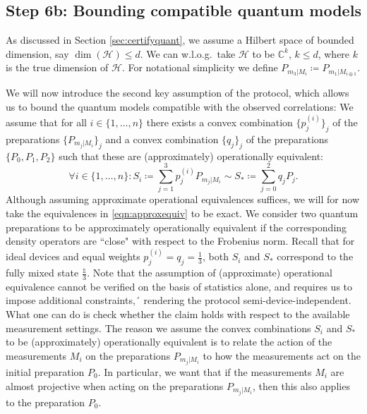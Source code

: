 \subsection{Step 6b: Bounding compatible quantum models}
\label{sec:boundingmodels}
As discussed in Section \ref{sec:certifyquant}, we assume a Hilbert space of bounded dimension, say $\operatorname{dim}(\mathcal{H})\leq d$. We can w.l.o.g.\ take $\mathcal{H}$ to be $\mathbb{C}^k$, $k\leq d$, where $k$ is the true dimension of $\mathcal{H}$. For notational simplicity we define $P_{m_3\vert M_i}\coloneqq P_{m_1\vert M_{i\oplus 1}}$.

We will now introduce the second key assumption of the protocol, which allows us to bound the quantum models compatible with the observed correlations: We assume that for all $i\in\{1,\dots,n\}$ there exists a convex combination $\{p_j^{(i)}\}_j$ of the preparations $\{P_{m_j\vert M_i}\}_j$ and a convex combination $\{q_j\}_j$ of the preparations $\{P_0,P_1,P_2\}$ such that these are (approximately) operationally equivalent:
\begin{equation}
\label{eqn:approxequiv}
\forall i\in\{1,\dots,n\}: S_i \coloneqq \sum_{j=1}^3 p_j^{(i)}P_{m_j\vert M_i} \sim S_* \coloneqq \sum_{j=0}^2 q_j P_j.
\end{equation}
Although assuming approximate operational equivalences suffices, we will for now take the equivalences in \ref{eqn:approxequiv} to be exact. We consider two quantum preparations to be approximately operationally equivalent if the corresponding density operators are ``close" with respect to the Frobenius norm. Recall that for ideal devices and equal weights $p_j^{(i)}=q_j=\frac{1}{3}$, both $S_i$ and $S_{*}$ correspond to the fully mixed state $\frac{\mathbb{1}}{3}$. Note that the assumption of (approximate) operational equivalence cannot be verified on the basis of statistics alone, and requires us to impose additional constraints,´ rendering the protocol semi-device-independent. What one can do is check whether the claim holds with respect to the available measurement settings. The reason we assume the convex combinations $S_i$ and $S_{*}$ to be (approximately) operationally equivalent is to relate the action of the measurements $M_i$ on the preparations $P_{m_j\vert M_i}$ to how the measurements act on the initial preparation $P_0$. In particular, we want that if the measurements $M_i$ are almost projective when acting on the preparations $P_{m_j\vert M_i}$, then this also applies to the preparation $P_0$.


